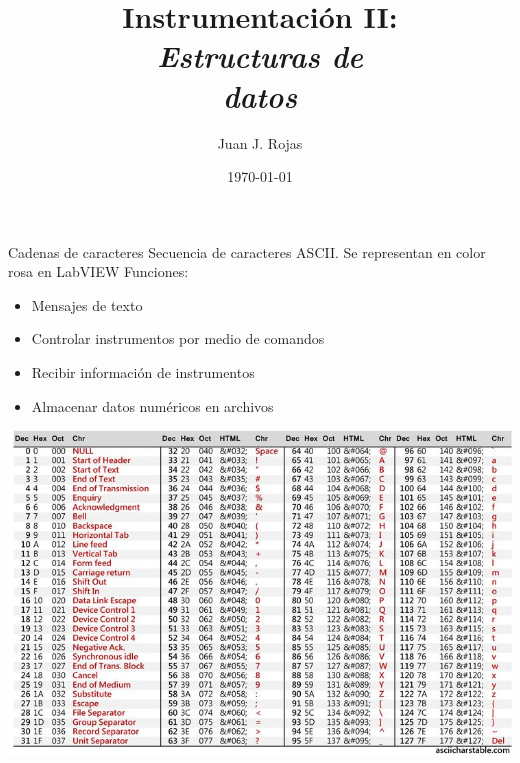 \documentclass[aspectratio=169]{beamer}
\title{Instrumentación II: \\ \emph{Estructuras de}\\ \emph{datos}}
\author{Juan J. Rojas}
\institute{Instituto Tecnológico de Costa Rica}
\date{\today}
\begin{document}

\maketitle

\newcommand{\blackandwhite}{white} %

\begin{frame}{Cadenas de caracteres}
Secuencia de caracteres ASCII. Se representan en color rosa en LabVIEW
Funciones: 
    \begin{itemize}
        \item Mensajes de texto
        \item Controlar instrumentos por medio de comandos
        \item Recibir información de instrumentos
        \item Almacenar datos numéricos en archivos
    \end{itemize}
\end{frame}


\begin{frame}{}
    \begin{center}
        \includegraphics[width=0.93\linewidth]{fig/ASCII.jpg}
    \end{center}
\end{frame}
\end{document}

